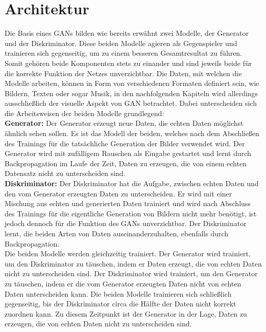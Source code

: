 \section{Architektur}

\noindent Die Basis eines \acp{GAN} bilden wie bereits erwähnt zwei Modelle, der Generator und der Diskriminator. Diese beiden Modelle agieren als Gegenspieler und trainieren sich gegenseitig, um zu einem besseren Gesamtresultat zu führen. Somit gehören beide Komponenten stets zu einander und sind jeweils beide für die korrekte Funktion der Netzes unverzichtbar. Die Daten, mit welchen die Modelle arbeiten, können in Form von verschiedenen Formaten definiert sein, wie Bildern, Texten oder sogar Musik, in den nachfolgenden Kapiteln wird allerdings ausschließlich der visuelle Aspekt von \acs{GAN} betrachtet. Dabei unterscheiden sich die Arbeitsweisen der beiden Modelle grundlegend: \\

\noindent \textbf{Generator:} Der Generator erzeugt neue Daten, die echten Daten möglichst ähnlich sehen sollen. Es ist das Modell der beiden, welches nach dem Abschließen des Trainings für die tatsächliche Generation der Bilder verwendet wird. Der Generator wird mit zufälligem Rauschen als Eingabe gestartet und lernt durch Backpropagation im Laufe der Zeit, Daten zu erzeugen, die von einem echten Datensatz nicht zu unterscheiden sind. \\

\noindent \textbf{Diskriminator:} Der Diskriminator hat die Aufgabe, zwischen echten Daten und den vom Generator erzeugten Daten zu unterscheiden. Er wird mit einer Mischung aus echten und generierten Daten trainiert und wird nach Abschluss des Trainings für die eigentliche Generation von Bildern nicht mehr benötigt, ist jedoch dennoch für die Funktion des \acp{GAN} unverzichtbar. Der Diskriminator lernt, die beiden Arten von Daten auseinanderzuhalten, ebenfalls durch Backpropagation. \\

\noindent Die beiden Modelle werden gleichzeitig trainiert. Der Generator wird trainiert, um den Diskriminator zu täuschen, indem er Daten erzeugt, die von echten Daten nicht zu unterscheiden sind. Der Diskriminator wird trainiert, um den Generator zu täuschen, indem er die vom Generator erzeugten Daten nicht von echten Daten unterscheiden kann. Die beiden Modelle trainieren sich schließlich gegenseitig, bis der Diskriminator circa die Hälfte der Daten nicht korrekt zuordnen kann. Zu diesem Zeitpunkt ist der Generator in der Lage, Daten zu erzeugen, die von echten Daten nicht zu unterscheiden sind. \\

